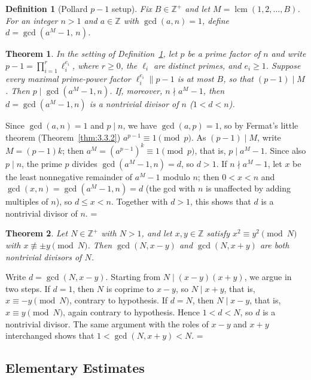 \documentclass[11pt]{article}
\makeatletter
\theoremstyle{ntstyle}
\newtheorem{theorem}{Theorem}[subsection]
\newtheorem{definition}{Definition}[subsection]
\let\nt@closedisplay\]
\def\nt@guardedclose{\@ifnextchar\par{\nt@closeafterpar}{\@ifnextchar\end{\postdisplaypenalty\@M\nt@closedisplay}{\nt@closedisplay}}}
\def\nt@closeafterpar\par{\@ifnextchar\par{\nt@closeafterpar}{\@ifnextchar\end{\postdisplaypenalty\@M\nt@closedisplay\par}{\nt@closedisplay\par}}}
\renewenvironment{proof}[1][\proofname]{\par
  \pushQED{\qed}\normalfont\topsep\medskipamount\edef\nt@afterproof{\@endparpenalty=\the\@endparpenalty\relax}\@beginparpenalty\@M\@endparpenalty\@M\let\]\nt@guardedclose\trivlist\item[]\textit{#1\@addpunct{.}} \ignorespaces}{\ifvmode\addpenalty\@M\fi\popQED\nt@afterproof\endtrivlist\@endpefalse}
\DeclareMathOperator{\lcm}{lcm}
\makeatother
\begin{document}
\begin{definition}[Pollard $p-1$ setup]\label{def:9.5.1} Fix $B\in\mathbb{Z}^+$ and let
	$M=\lcm(1, 2, \ldots, B)$. For an integer $n>1$ and $a\in\mathbb{Z}$
	with $\gcd(a, n)=1$, define $d = \gcd(a^M-1, \, n)$.
\end{definition}
\begin{theorem}\label{thm:9.5.2} In the setting of
	Definition~\ref{def:9.5.1}, let $p$ be a prime factor of $n$ and write
	$p-1=\prod_{i=1}^{r}\ell_i^{e_i}$, where $r\ge0$, the $\ell_i$ are distinct
	primes, and $e_i\ge1$. Suppose every maximal prime-power factor
	$\ell_i^{e_i}\parallel p-1$ is at most $B$, so that $(p-1)\mid M$.
	Then $p \mid \gcd(a^M-1, n)$. If, moreover, $n \nmid
		a^M-1$, then $d=\gcd(a^M-1, n)$ is a nontrivial divisor of $n$ ($1<d<n$).
\end{theorem}

\begin{proof} Since $\gcd(a, n)=1$ and $p\mid n$,
	we have $\gcd(a, p)=1$, so by Fermat's little theorem (Theorem~\ref{thm:3.3.2})
	$a^{p-1}\equiv1\pmod{p}$. As $(p-1)\mid M$, write $M=(p-1)k$; then
	$a^M=(a^{p-1})^k\equiv1\pmod{p}$, that is, $p\mid a^M-1$. Since also
	$p\mid n$, the prime $p$ divides $\gcd(a^M-1, n)=d$, so $d>1$. If $n\nmid
		a^M-1$, let $x$ be the least nonnegative remainder of $a^M-1$ modulo
	$n$; then $0<x<n$ and $\gcd(x, n)=\gcd(a^M-1, n)=d$ (the gcd with $n$ is
	unaffected by adding multiples of $n$), so $d\le x<n$. Together with
	$d>1$, this shows that $d$ is a nontrivial divisor of $n$.
\end{proof}
\begin{theorem}\label{thm:9.5.3}
	Let $N\in\mathbb{Z}^+$ with $N>1$, and let $x,y\in\mathbb{Z}$ satisfy
	$x^{2}\equiv y^{2}\pmod{N}$ with $x\not\equiv\pm y\pmod{N}$.
	Then $\gcd(N,x-y)$ and $\gcd(N,x+y)$ are both nontrivial divisors of $N$.
\end{theorem}

\begin{proof} Write $d=\gcd(N,x-y)$. Starting from $N\mid(x-y)(x+y)$, we argue in
	two steps. If $d=1$, then $N$ is coprime to $x-y$, so $N\mid x+y$,
	that is, $x\equiv-y\pmod{N}$, contrary to hypothesis. If $d=N$, then
	$N\mid x-y$, that is, $x\equiv y\pmod{N}$, again contrary to hypothesis. Hence
	$1<d<N$, so $d$ is a nontrivial divisor. The same argument with the roles of
	$x-y$ and $x+y$ interchanged shows that $1<\gcd(N,x+y)<N$.
\end{proof}
\subsection{Elementary Estimates}
\end{document}
